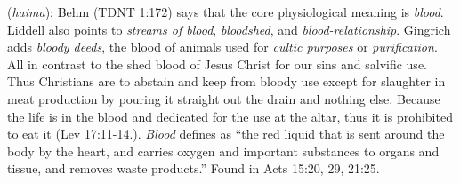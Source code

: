\item[Blood,]
 
(\textit{haima}):
Behm (TDNT 1:172) says that the core physiological meaning is \emph{blood}. Liddell also points to \emph{streams of blood}, \emph{bloodshed}, and \emph{blood-relationship}. Gingrich adds \emph{bloody deeds}, the blood of animals used for \emph{cultic purposes} or \emph{purification}. All in contrast to the shed blood of Jesus Christ for our sins and salvific use. Thus Christians are to abstain and keep from bloody use except for slaughter in meat production by pouring it straight out the drain and nothing else. Because the life is in the blood and dedicated for the use at the altar, thus it is prohibited to eat it (Lev 17:11-14.). \emph{Blood} defines as “the red liquid that is sent around the body by the heart, and carries oxygen and important substances to organs and tissue, and removes waste products.”
Found in Acts 15:20, 29, 21:25.
